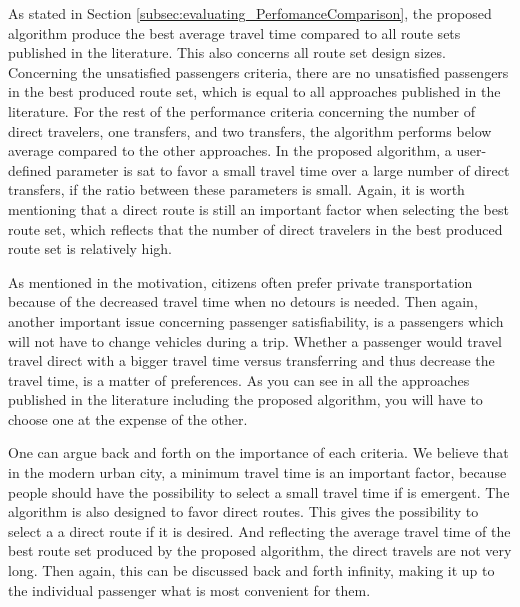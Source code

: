 As stated in Section \vref{subsec:evaluating_PerfomanceComparison}, the proposed algorithm produce the best average travel time compared to all route sets published in the literature. This also concerns all route set design sizes. Concerning the unsatisfied passengers criteria, there are no unsatisfied passengers in the best produced route set, which is equal to all approaches published in the literature. For the rest of the performance criteria concerning the number of direct travelers, one transfers, and two transfers, the algorithm performs below average compared to the other approaches. In the proposed algorithm, a user-defined parameter is sat to favor a small travel time over a large number of direct transfers, if the ratio between these parameters is small. Again, it is worth mentioning that a direct route is still an important factor when selecting the best route set, which reflects that the number of direct travelers in the best produced route set is relatively high.

As mentioned in the motivation, citizens often prefer private transportation because of the decreased travel time when no detours is needed. Then again, another important issue concerning passenger satisfiability, is a passengers which will not have to change vehicles during a trip. Whether a passenger would travel travel direct with a bigger travel time versus transferring and thus decrease the travel time, is a matter of preferences. As you can see in all the approaches published in the literature including the proposed algorithm, you will have to choose one at the expense of the other. 

One can argue back and forth on the importance of each criteria. We believe that in the modern urban city, a minimum travel time is an important factor, because people should have the possibility to select a small travel time if is emergent. The algorithm is also designed to favor direct routes. This gives the possibility to select a a direct route if it is desired. And reflecting the average travel time of the best route set produced by the proposed algorithm, the direct travels are not very long. %
Then again, this can be discussed back and forth infinity, making it up to the individual passenger what is most convenient for them. 


